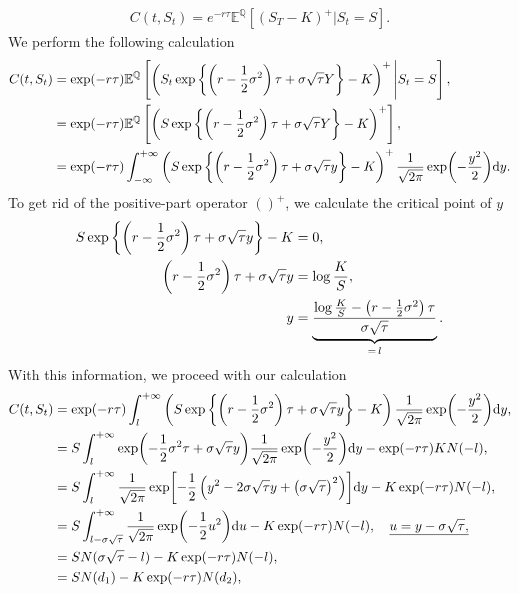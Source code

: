 \documentclass{book}
\begin{document}
\begin{align*}
    C(t, S_t) = e^{-r \tau} \mathbb{E}^{\mathbb{Q}}[(S_T-K)^+ | S_t = S].
\end{align*}
We perform the following calculation
\begin{align*}
    C(t,S_t) &= \exp(-r\tau) \mathbb{E}^\mathbb{Q}\left[ \left({S_t} \exp \left\{ \left(r - \frac{1}{2} \sigma^2\right)\tau + \sigma  \sqrt{\tau} Y \right\} - K \right)^+ \Bigg| S_t = S\right], \notag\\
    &=  \exp(-r\tau) \mathbb{E}^\mathbb{Q}\left[ \left(S \exp \left\{ \left(r - \frac{1}{2} \sigma^2\right)\tau + \sigma  \sqrt{\tau} Y \right\} - K \right)^+ \right], \notag\\
    &= \exp(-r\tau) \int_{-\infty}^{+\infty} \left(S \exp \left\{ \left(r - \frac{1}{2} \sigma^2\right)\tau + \sigma  \sqrt{\tau} y \right\} - K \right)^+  \frac{1}{\sqrt{2\pi}}\exp({-\frac{y^2}{2}}) \dd y. \notag
\end{align*}
To get rid of the positive-part operator $()^+$, we calculate the critical point of $y$
\begin{align}
    S \exp \left\{ \left(r - \frac{1}{2} \sigma^2\right)\tau + \sigma  \sqrt{\tau} y \right\} - K &=0, \notag\\
    \left(r - \frac{1}{2} \sigma^2\right)\tau + \sigma  \sqrt{\tau} y &= \log \frac{K}{S}, \notag\\
    y &= \underbrace{\frac{\log \frac{K}{S} - \left(r - \frac{1}{2} \sigma^2\right)\tau} {\sigma \sqrt{\tau}}}_{ =\, l}.
\end{align}
With this information, we proceed with our calculation
\begin{align}
    C(t,S_t) &= \exp(-r\tau) \int_{l}^{+\infty} \left(S \exp \left\{ \left(r - \frac{1}{2} \sigma^2\right)\tau + \sigma  \sqrt{\tau} y \right\} - K \right) \frac{1}{\sqrt{2\pi}}\exp({-\frac{y^2}{2}}) \dd y, \notag\\
    &= S \int_{l}^{+\infty}  \exp (- \frac{1}{2} \sigma^2 \tau + \sigma \sqrt{\tau} y) \frac{1}{\sqrt{2\pi}}\exp({-\frac{y^2}{2}}) \dd y - \exp(-r\tau) KN(-l), \notag\\
    &= S \int_{l}^{+\infty} \frac{1}{\sqrt{2\pi}}\exp[{-\frac{1}{2}} \left(y^2 - 2\sigma  \sqrt{\tau} y + \big(\sigma\sqrt{\tau}\big)^2\right)] \dd y - K \exp(-r\tau) N(-l), \notag \\
    &= S \int_{l - \sigma\sqrt{\tau}}^{+\infty} \frac{1}{\sqrt{2\pi}}\exp(-\frac{1}{2} u^2) \dd u - K \exp(-r\tau) N(-l), \quad  \underline{u = y - \sigma\sqrt{\tau},} \notag\\
    &= S N (\sigma\sqrt{\tau} - l) - K \exp(-r\tau) N(-l), \notag \\
    &= S N (d_1) - K \exp(-r\tau) N(d_2), 
    \label{eqn:BS-Exp:call}
\end{align}
\end{document}

